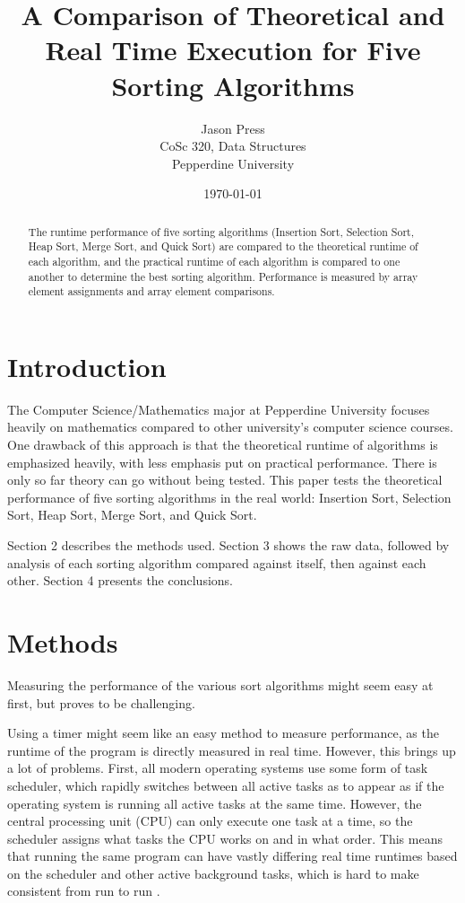 \documentclass[10pt,fleqn]{article}
\title{A Comparison of Theoretical and Real Time Execution for Five Sorting Algorithms\\}
\author{Jason Press\\CoSc 320, Data Structures\\Pepperdine University}
\date{\today}
\begin{document}
\maketitle


\begin{abstract}

The runtime performance of five sorting algorithms (Insertion Sort, Selection Sort, Heap Sort, Merge Sort, and Quick Sort) are compared to the theoretical runtime of each algorithm, and the practical runtime of each algorithm is compared to one another to determine the best sorting algorithm. Performance is measured by array element assignments and array element comparisons. 

\end{abstract}

\section{Introduction}

The Computer Science/Mathematics major at Pepperdine University focuses heavily on mathematics compared to other university's computer science courses. One drawback of this approach is that the theoretical runtime of algorithms is emphasized heavily, with less emphasis put on practical performance. There is only so far theory can go without being tested. This paper tests the theoretical performance of five sorting algorithms in the real world: Insertion Sort, Selection Sort, Heap Sort, Merge Sort, and Quick Sort.

Section 2 describes the methods used. Section 3 shows the raw data, followed by analysis of each sorting algorithm compared against itself, then against each other. Section 4 presents the conclusions.

\section{Methods}

Measuring the performance of the various sort algorithms might seem easy at first, but proves to be challenging. 

Using a timer might seem like an easy method to measure performance, as the runtime of the program is directly measured in real time. However, this brings up a lot of problems. First, all modern operating systems use some form of task scheduler, which rapidly switches between all active  tasks as to appear as if the operating system is running all active tasks at the same time. However, the central processing unit (CPU) can only execute one task at a time, so the scheduler assigns what tasks the CPU works on and in what order. This means that running the same program can have vastly differing real time runtimes based on the scheduler and other active background tasks, which is hard to make consistent from run to run \cite{dp4ds}.
\end{document}
